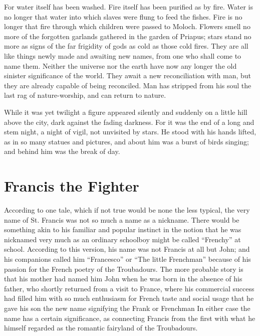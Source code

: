 \documentclass{book}
\begin{document}
For water itself has been washed. Fire itself has been purified as by fire. Water is no longer that water into which slaves were flung to feed the fishes. Fire is no longer that fire through which children were passed to Moloch. Flowers smell no more of the forgotten garlands gathered in the garden of Priapus; stars stand no more as signs of the far frigidity of gods as cold as those cold fires. They are all like things newly made and awaiting new names, from one who shall come to name them. Neither the universe nor the earth have now any longer the old sinister significance of the world. They await a new reconciliation with man, but they are already capable of being reconciled. Man has stripped from his soul the last rag of nature-worship, and can return to nature.

While it was yet twilight a figure appeared silently and suddenly on a little hill above the city, dark against the fading darkness. For it was the end of a long and stem night, a night of vigil, not unvisited by stars. He stood with his hands lifted, as in so many statues and pictures, and about him was a burst of birds singing; and behind him was the break of day.

\chapter{Francis the Fighter}
\label{chapter-2}
According to one tale, which if not true would be none the less typical, the very name of St. Francis was not so much a name as a nickname. There would be something akin to his familiar and popular instinct in the notion that he was nicknamed very much as an ordinary schoolboy might be called “Frenchy” at school. According to this version, his name was not Francis at all but John; and his companions called him “Francesco” or “The little Frenchman” because of his passion for the French poetry of the Troubadours. The more probable story is that his mother had named him John when he was born in the absence of his father, who shortly returned from a visit to France, where his commercial success had filled him with so much enthusiasm for French taste and social usage that he gave his son the new name signifying the Frank or Frenchman In either case the name has a certain significance, as connecting Francis from the first with what he himself regarded as the romantic fairyland of the Troubadours.
\end{document}
